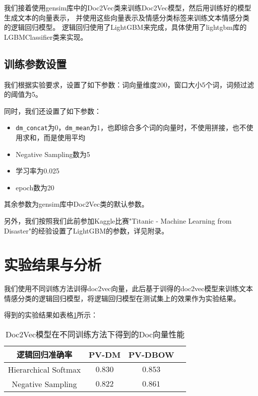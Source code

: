 \documentclass{article}
\begin{document}
我们接着使用gensim库中的Doc2Vec类来训练Doc2Vec模型，然后用训练好的模型生成文本的向量表示，
并使用这些向量表示及情感分类标签来训练文本情感分类的逻辑回归模型。
逻辑回归使用了LightGBM来完成，具体使用了lightgbm库的LGBMClassifier类来实现。

\subsection{训练参数设置}
我们根据实验要求，设置了如下参数：词向量维度200，窗口大小5个词，词频过滤的阈值为5。

同时，我们还设置了如下参数：
\begin{itemize}
  \item \verb|dm_concat|为0，\verb|dm_mean|为1，也即综合多个词的向量时，不使用拼接，也不使用求和，而是使用平均
  \item Negative Sampling数为5
  \item 学习率为0.025
  \item epoch数为20
\end{itemize}

其余参数为gensim库中Doc2Vec类的默认参数。

另外，我们按照我们此前参加Kaggle比赛"Titanic - Machine Learning from Disaster"的经验设置了LightGBM的参数，详见附录。



\section{实验结果与分析}

我们使用不同训练方法训得doc2vec向量，此后基于训得的doc2vec模型来训练文本情感分类的逻辑回归模型，将逻辑回归模型在测试集上的效果作为实验结果。

得到的实验结果如表格\ref{tab:results}所示：
\begin{table}[htbp]
  \caption{Doc2Vec模型在不同训练方法下得到的Doc向量性能}
  \label{tab:results}
  \vspace{5pt}
  \centering
  \begin{tabular}{cccc}
    \toprule
    逻辑回归准确率       & PV-DM   & PV-DBOW \\
    \midrule
    Hierarchical Softmax & $0.830$ & $0.853$ \\
    \midrule
    Negative Sampling    & $0.822$ & $0.861$ \\
    \bottomrule
  \end{tabular}
\end{table}
\end{document}
